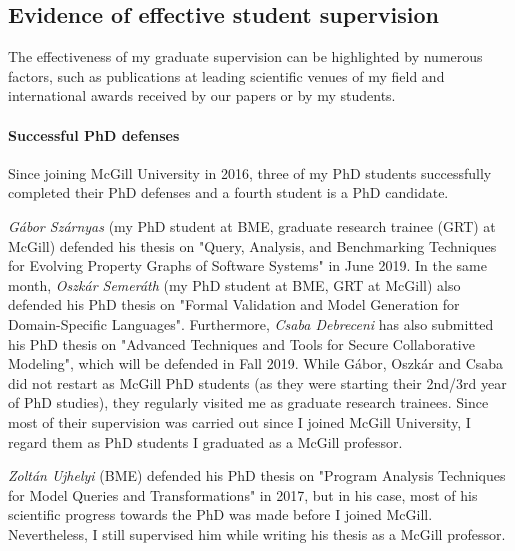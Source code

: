 \subsection{Evidence of effective student supervision}
\label{sec:evid-student-super}

The effectiveness of my graduate supervision can be highlighted by numerous factors, such as publications at leading scientific venues of my field and international awards received by our papers or by my students. 


\paragraph{Successful PhD defenses}
Since joining McGill University in 2016, three of my PhD students successfully completed their PhD defenses and a fourth student is a PhD candidate. 

\emph{Gábor Szárnyas} (my PhD student at BME, graduate research trainee (GRT) at McGill) defended his thesis on "Query, Analysis, and Benchmarking Techniques for Evolving Property Graphs of Software Systems" in June 2019. In the same month, \emph{Oszkár Semeráth} (my PhD student at BME, GRT at McGill) also defended his PhD thesis on "Formal Validation and Model Generation for Domain-Specific Languages". Furthermore, \emph{Csaba Debreceni} has also submitted his PhD thesis on "Advanced Techniques and Tools for Secure Collaborative Modeling", which will be defended in Fall 2019. 
While Gábor, Oszkár and Csaba did not restart as McGill PhD students (as they were starting their 2nd/3rd year of PhD studies), they regularly visited me as graduate research trainees. Since most of their supervision was carried out since I joined McGill University, I regard them as PhD students I graduated as a McGill professor. 

\emph{Zoltán Ujhelyi} (BME) defended his PhD thesis on "Program Analysis Techniques for Model Queries and Transformations" in 2017, but in his case, most of his scientific progress towards the PhD was made before I joined McGill. Nevertheless, I still supervised him while writing his thesis as a McGill professor.  

